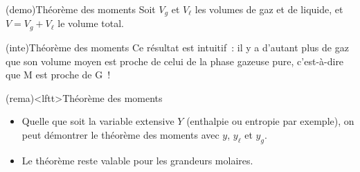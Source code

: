 \documentclass[../../main/main.tex]{subfiles}
\begin{document}
\begin{tcb*}(demo){Théorème des moments}
	Soit $V_g$ et $V_{\ell}$ les volumes de gaz et de liquide, et $V = V_g +
		V_{\ell}$ le volume total.
	\vspace{-15pt}
\end{tcb*}

\begin{tcb*}(inte){Théorème des moments}
	Ce résultat est intuitif~: il y a d'autant plus de gaz que son volume moyen
	est proche de celui de la phase gazeuse pure, c'est-à-dire que M est proche de
	G~!
\end{tcb*}

\begin{tcb}(rema)<lftt>{Théorème des moments}
	\begin{itemize}
		\item Quelle que soit la variable extensive $Y$ (enthalpie ou entropie par
		      exemple), on peut démontrer le théorème des moments avec $y$, $y_{\ell}$
		      et $y_g$.
		\item Le théorème reste valable pour les grandeurs molaires.
	\end{itemize}
\end{tcb}
\end{document}
